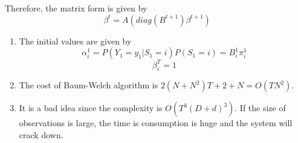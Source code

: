 \documentclass[]{article}
\begin{document}
Therefore, the matrix form is given by
\[\beta^t = A\left(diag(B^{t+1})\beta^{t+1}\right)\]

\begin{enumerate}
\def\labelenumi{\arabic{enumi}.}
\setcounter{enumi}{6}
\item
  The initial values are given by
  \[\alpha^1_i = P(Y_1=y_1|S_1=i)P(S_1=i) = B^1_i\pi^1_i\]
  \[\beta^T_i = 1\]
\item
  The cost of Baum-Welch algorithm is \(2(N+N^2)T + 2 + N = O(TN^2)\).
\item
  It is a bad idea since the complexity is \(O(T^3(D+d)^3)\). If the
  size of observations is large, the time is consumption is huge and the
  system will crack down.
\end{enumerate}
\end{document}
